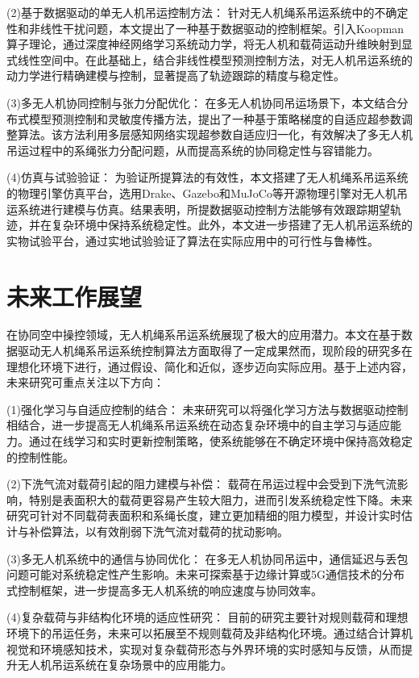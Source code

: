 \documentclass[lang=chs, degree=master, blindreview=false, winfonts=true]{yanputhesis}
\begin{document}
(2)基于数据驱动的单无人机吊运控制方法：
针对无人机绳系吊运系统中的不确定性和非线性干扰问题，本文提出了一种基于数据驱动的控制框架。引入Koopman算子理论，通过深度神经网络学习系统动力学，将无人机和载荷运动升维映射到显式线性空间中。在此基础上，结合非线性模型预测控制方法，对无人机吊运系统的动力学进行精确建模与控制，显著提高了轨迹跟踪的精度与稳定性。

(3)多无人机协同控制与张力分配优化：
在多无人机协同吊运场景下，本文结合分布式模型预测控制和灵敏度传播方法，提出了一种基于策略梯度的自适应超参数调整算法。该方法利用多层感知网络实现超参数自适应归一化，有效解决了多无人机吊运过程中的系绳张力分配问题，从而提高系统的协同稳定性与容错能力。

(4)仿真与试验验证：
为验证所提算法的有效性，本文搭建了无人机绳系吊运系统的物理引擎仿真平台，选用Drake、Gazebo和MuJoCo等开源物理引擎对无人机吊运系统进行建模与仿真。结果表明，所提数据驱动控制方法能够有效跟踪期望轨迹，并在复杂环境中保持系统稳定性。此外，本文进一步搭建了无人机吊运系统的实物试验平台，通过实地试验验证了算法在实际应用中的可行性与鲁棒性。

\section{未来工作展望}
在协同空中操控领域，无人机绳系吊运系统展现了极大的应用潜力。本文在基于数据驱动无人机绳系吊运系统控制算法方面取得了一定成果然而，现阶段的研究多在理想化环境下进行，通过假设、简化和近似，逐步迈向实际应用。基于上述内容，未来研究可重点关注以下方向：

(1)强化学习与自适应控制的结合：
未来研究可以将强化学习方法与数据驱动控制相结合，进一步提高无人机绳系吊运系统在动态复杂环境中的自主学习与适应能力。通过在线学习和实时更新控制策略，使系统能够在不确定环境中保持高效稳定的控制性能。

(2)下洗气流对载荷引起的阻力建模与补偿：
载荷在吊运过程中会受到下洗气流影响，特别是表面积大的载荷更容易产生较大阻力，进而引发系统稳定性下降。未来研究可针对不同载荷表面积和系绳长度，建立更加精细的阻力模型，并设计实时估计与补偿算法，以有效削弱下洗气流对载荷的扰动影响。

(3)多无人机系统中的通信与协同优化：
在多无人机协同吊运中，通信延迟与丢包问题可能对系统稳定性产生影响。未来可探索基于边缘计算或5G通信技术的分布式控制框架，进一步提高多无人机系统的响应速度与协同效率。

(4)复杂载荷与非结构化环境的适应性研究：
目前的研究主要针对规则载荷和理想环境下的吊运任务，未来可以拓展至不规则载荷及非结构化环境。通过结合计算机视觉和环境感知技术，实现对复杂载荷形态与外界环境的实时感知与反馈，从而提升无人机吊运系统在复杂场景中的应用能力。
\end{document}
